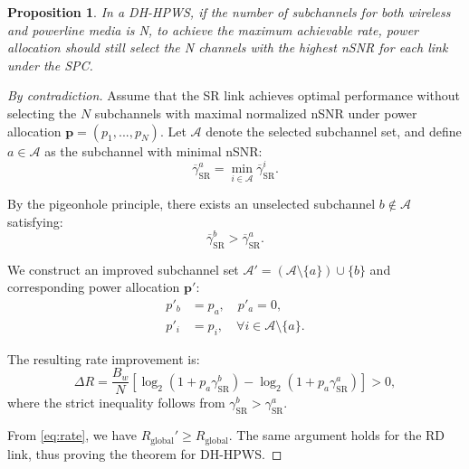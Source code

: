 \documentclass[lettersize,journal]{IEEEtran}
\newtheorem{proposition}{Proposition}
\begin{document}
	\begin{proposition}
		 In a DH-HPWS, if the number of subchannels for both wireless and powerline media is N, to achieve the maximum achievable rate, power allocation should still select the N channels with the highest nSNR for each link under the SPC. 
	\end{proposition}
	\begin{proof}[By contradiction]
		Assume that the SR link achieves optimal performance without selecting the $N$ subchannels with maximal normalized nSNR under power allocation $\mathbf{p} = (p_1,...,p_N)$. Let $\mathcal{A}$ denote the selected subchannel set, and define $a \in \mathcal{A}$ as the subchannel with minimal nSNR:
		\begin{equation}
			\overline \gamma_{\mathrm{SR}}^{a} = \min_{i \in \mathcal{A}} \overline \gamma_{\mathrm{SR}}^{i}.
		\end{equation}
		
		By the pigeonhole principle, there exists an unselected subchannel $b \notin \mathcal{A}$ satisfying:
		\begin{equation}
			\overline \gamma_{\mathrm{SR}}^{b} > \overline \gamma_{\mathrm{SR}}^{a}.
		\end{equation}
		
		We construct an improved subchannel set $\mathcal{A}' = (\mathcal{A}\setminus\{a\}) \cup \{b\}$ and corresponding power allocation $\mathbf{p}'$:
		\begin{align}
			p'_b &= p_a, \quad p'_a = 0, \\
			p'_i &= p_i, \quad \forall i \in \mathcal{A}\setminus\{a\}.
		\end{align}
		
		The resulting rate improvement is:
		\begin{equation}
			\Delta R = \frac{B_w}{N} \left[ \log_2(1 + p_a\gamma_{\mathrm{SR}}^{b}) - \log_2(1 + p_a\gamma_{\mathrm{SR}}^{a}) \right] > 0,
		\end{equation}
		where the strict inequality follows from $\gamma_{\mathrm{SR}}^{b} > \gamma_{\mathrm{SR}}^{a}$.
		
	    From \eqref{eq:rate}, we have $R_{\mathrm{global}}'  \geq R_{\mathrm{global}}$. The same argument holds for the RD link, thus proving the theorem for DH-HPWS. \qedhere
	\end{proof}
	
\end{document}
